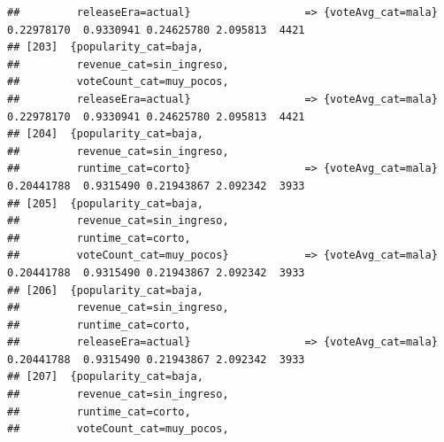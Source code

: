 \documentclass[
]{article}
\begin{document}
\begin{verbatim}
##         releaseEra=actual}                  => {voteAvg_cat=mala}                0.22978170  0.9330941 0.24625780 2.095813  4421
## [203]  {popularity_cat=baja,                                                                                                    
##         revenue_cat=sin_ingreso,                                                                                                
##         voteCount_cat=muy_pocos,                                                                                                
##         releaseEra=actual}                  => {voteAvg_cat=mala}                0.22978170  0.9330941 0.24625780 2.095813  4421
## [204]  {popularity_cat=baja,                                                                                                    
##         revenue_cat=sin_ingreso,                                                                                                
##         runtime_cat=corto}                  => {voteAvg_cat=mala}                0.20441788  0.9315490 0.21943867 2.092342  3933
## [205]  {popularity_cat=baja,                                                                                                    
##         revenue_cat=sin_ingreso,                                                                                                
##         runtime_cat=corto,                                                                                                      
##         voteCount_cat=muy_pocos}            => {voteAvg_cat=mala}                0.20441788  0.9315490 0.21943867 2.092342  3933
## [206]  {popularity_cat=baja,                                                                                                    
##         revenue_cat=sin_ingreso,                                                                                                
##         runtime_cat=corto,                                                                                                      
##         releaseEra=actual}                  => {voteAvg_cat=mala}                0.20441788  0.9315490 0.21943867 2.092342  3933
## [207]  {popularity_cat=baja,                                                                                                    
##         revenue_cat=sin_ingreso,                                                                                                
##         runtime_cat=corto,                                                                                                      
##         voteCount_cat=muy_pocos,                                                                                                

\end{verbatim}
\end{document}
